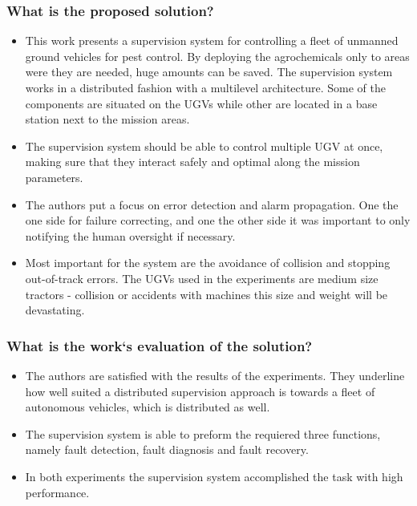     \subsubsection*{What is the proposed solution?}
    \begin{itemize}
        \item  This work presents a supervision system for controlling a fleet of unmanned ground vehicles for pest control. By deploying the agrochemicals only to areas were they are needed, huge amounts can be saved. The supervision system works in a distributed fashion with a multilevel architecture. Some of the components are situated on the UGVs while other are located in a base station next to the mission areas.
        \item The supervision system should be able to control multiple UGV at once, making sure that they interact safely and optimal along the mission parameters.  
        \item The authors put a focus on error detection and alarm propagation. One the one side for failure correcting, and one the other side it was important to only notifying the human oversight if necessary. 
        \item Most important for the system are the avoidance of collision and stopping out-of-track errors. The UGVs used in the experiments are medium size tractors - collision or accidents with machines this size and weight will be devastating.
    \end{itemize}
    \subsubsection*{What is the work`s evaluation of the solution?}
    \begin{itemize}
        \item The authors are satisfied with the results of the experiments. They underline how well suited a distributed supervision approach is towards a fleet of autonomous vehicles, which is distributed as well.
        \item The supervision system is able to preform the requiered three functions, namely fault detection, fault diagnosis and fault recovery.
        \item In both experiments the supervision system accomplished the task with high performance.
    \end{itemize}
